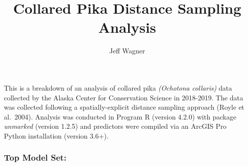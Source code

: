 \documentclass[
]{article}
\title{Collared Pika Distance Sampling Analysis}
\author{Jeff Wagner}
\date{}
\begin{document}
\maketitle

This is a breakdown of an analysis of collared pika \emph{(Ochotona
collaris)} data collected by the Alaska Center for Conservation Science
in 2018-2019. The data was collected following a spatially-explicit
distance sampling approach (Royle et al.~2004). Analysis was conducted
in Program R (version 4.2.0) with package \emph{unmarked} (version
1.2.5) and predictors were compiled via an ArcGIS Pro Python
installation (version 3.6+).

\hypertarget{top-model-set}{%
\subsubsection{\texorpdfstring{\textbf{Top Model
Set:}}{Top Model Set:}}\label{top-model-set}}
\end{document}
